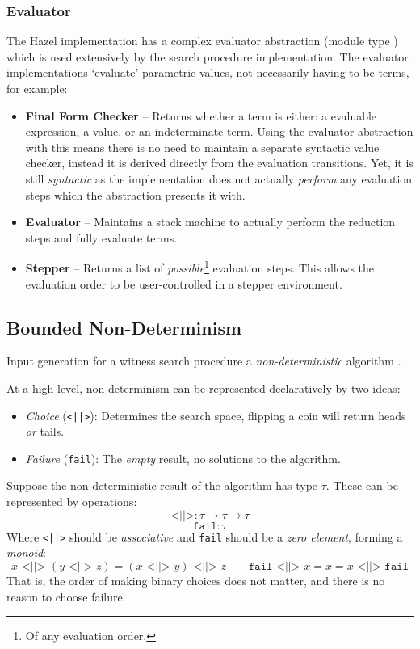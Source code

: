 \subsubsection{Evaluator}\label{sec:HazelEvaluator}
The Hazel implementation has a complex evaluator abstraction (module type ) which is used extensively by the search procedure implementation. The evaluator implementations `evaluate' parametric values, not necessarily having to be terms, for example:
\begin{itemize}
\item \textbf{Final Form Checker} -- Returns whether a term is either: a evaluable expression, a value, or an indeterminate term. Using the evaluator abstraction with this means there is no need to maintain a separate syntactic value checker, instead it is derived directly from the evaluation transitions. Yet, it is still \textit{syntactic} as the implementation does not actually \textit{perform} any evaluation steps which the abstraction presents it with.
\item \textbf{Evaluator} -- Maintains a stack machine to actually perform the reduction steps and fully evaluate terms.
\item \textbf{Stepper} -- Returns a list of \textit{possible}\footnote{Of any evaluation order.} evaluation steps. This allows the evaluation order to be user-controlled in a stepper environment.
\end{itemize}

\subsection{Bounded Non-Determinism}\label{sec:Nondeterminism}
Input generation for a witness search procedure \cite{SearchProc} a \textit{non-deterministic} algorithm \cite{NondeterministicAlgorithms}. 

At a high level, non-determinism can be represented declaratively by two ideas:
\begin{itemize}
\item \textit{Choice} (\texttt{<||>}): Determines the search space, flipping a coin will return heads \textit{or} tails.
\item \textit{Failure} (\texttt{fail}): The \textit{empty} result, no solutions to the algorithm.
\end{itemize}
Suppose the non-deterministic result of the algorithm has type $\tau$. These can be represented by operations:
\[\texttt{<||>} : \tau \to \tau \to \tau\]
\[\texttt{fail} : \tau\]
Where \texttt{<||>} should be \textit{associative} and \texttt{fail} should be a \textit{zero element}, forming a \textit{monoid}:
\[x \texttt{ <||> } (y \texttt{ <||> } z) = (x \texttt{ <||> } y) \texttt{ <||> } z \qquad \texttt{fail} \texttt{ <||> } x = x = x \texttt{ <||> } \texttt{fail}\]
That is, the order of making binary choices does not matter, and there is no reason to choose failure.

